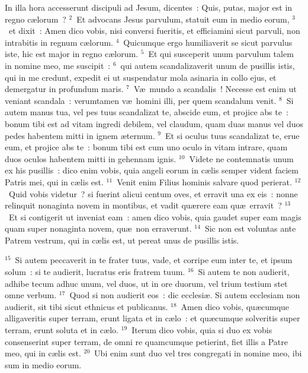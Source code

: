 \lettrine[lines=10,image=true,loversize=0.05,lraise=-0.03]{I}{}n illa hora accesserunt discipuli ad Jesum, dicentes~: Quis, putas, major est in regno c\ae lorum~?
${}^{2}$~Et advocans Jesus parvulum, statuit eum in medio eorum,
${}^{3}$~et dixit~: Amen dico vobis, nisi conversi fueritis, et efficiamini sicut parvuli, non intrabitis in regnum c\ae lorum.
${}^{4}$~Quicumque ergo humiliaverit se sicut parvulus iste, hic est major in regno c\ae lorum.
${}^{5}$~Et qui susceperit unum parvulum talem in nomine meo, me suscipit~:
${}^{6}$~qui autem scandalizaverit unum de pusillis istis, qui in me credunt, expedit ei ut suspendatur mola asinaria in collo ejus, et demergatur in profundum maris.
${}^{7}$~V\ae\ mundo a scandalis~! Necesse est enim ut veniant scandala~: verumtamen v\ae\ homini illi, per quem scandalum venit.
${}^{8}$~Si autem manus tua, vel pes tuus scandalizat te, abscide eum, et projice abs te~: bonum tibi est ad vitam ingredi debilem, vel claudum, quam duas manus vel duos pedes habentem mitti in ignem \ae ternum.
${}^{9}$~Et si oculus tuus scandalizat te, erue eum, et projice abs te~: bonum tibi est cum uno oculo in vitam intrare, quam duos oculos habentem mitti in gehennam ignis.
${}^{10}$~Videte ne contemnatis unum ex his pusillis~: dico enim vobis, quia angeli eorum in c\ae lis semper vident faciem Patris mei, qui in c\ae lis est.
${}^{11}$~Venit enim Filius hominis salvare quod perierat.
${}^{12}$~Quid vobis videtur~? si fuerint alicui centum oves, et erravit una ex eis~: nonne relinquit nonaginta novem in montibus, et vadit qu\ae rere eam qu\ae\ erravit~?
${}^{13}$~Et si contigerit ut inveniat eam~: amen dico vobis, quia gaudet super eam magis quam super nonaginta novem, qu\ae\ non erraverunt.
${}^{14}$~Sic non est voluntas ante Patrem vestrum, qui in c\ae lis est, ut pereat unus de pusillis istis.


${}^{15}$~Si autem peccaverit in te frater tuus, vade, et corripe eum inter te, et ipsum solum~: si te audierit, lucratus eris fratrem tuum.
${}^{16}$~Si autem te non audierit, adhibe tecum adhuc unum, vel duos, ut in ore duorum, vel trium testium stet omne verbum.
${}^{17}$~Quod si non audierit eos~: dic ecclesi\ae . Si autem ecclesiam non audierit, sit tibi sicut ethnicus et publicanus.
${}^{18}$~Amen dico vobis, qu\ae cumque alligaveritis super terram, erunt ligata et in c\ae lo~: et qu\ae cumque solveritis super terram, erunt soluta et in c\ae lo.
${}^{19}$~Iterum dico vobis, quia si duo ex vobis consenserint super terram, de omni re quamcumque petierint, fiet illis a Patre meo, qui in c\ae lis est.
${}^{20}$~Ubi enim sunt duo vel tres congregati in nomine meo, ibi sum in medio eorum.


